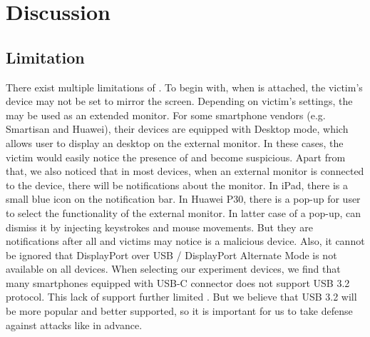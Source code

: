 \section{Discussion}
\label{sec:discussion}

\subsection{Limitation}
There exist multiple limitations of \tool. To begin with, when \tool is attached, the victim's device may not be set to mirror the screen. Depending on victim's settings, the \tool may be used as an extended monitor. For some smartphone vendors (e.g. Smartisan and Huawei), their devices are equipped with Desktop mode, which allows user to display an desktop on the external monitor. In these cases, the victim would easily notice the presence of \tool and become suspicious. Apart from that, we also noticed that in most devices, when an external monitor is connected to the device, there will be notifications about the monitor. In iPad, there is a small blue icon on the notification bar. In Huawei P30, there is a pop-up for user to select the functionality of the external monitor. In latter case of a pop-up, \tool can dismiss it by injecting keystrokes and mouse movements. But they are notifications after all and victims may notice \tool is a malicious device. Also, it cannot be ignored that DisplayPort over USB / DisplayPort Alternate Mode is not available on all devices. When selecting our experiment devices, we find that many smartphones equipped with USB-C connector does not support USB 3.2 protocol. This lack of support further limited \tool. But we believe that USB 3.2 will be more popular and better supported, so it is important for us to take defense against attacks like \tool in advance.
\begin{comment}
There exist multiple limitations of \tool.  To begin with, \tool can only gain
the information and control access of the host itself instead of external
hardware.  Consequently, as we introduced in the
Section~\ref{sec:countermeasures}, \tool can hardly bypass the defense
approaches that use external hardware for authorization.  Moreover, most of
the devices will prompt users to give authentication to the USB devices or
select one of the functional modes after they are plugged in.  Though some of
such prompts are not conspicuous for non-experts, especially when \tool is
concealed within other functional hardware such as power banks \shuqing{If
there is experiment, add it here.}, the probability of whether users could get
aware that something unusual happens will increase with the existence of these
prompting messages.
\end{comment}
